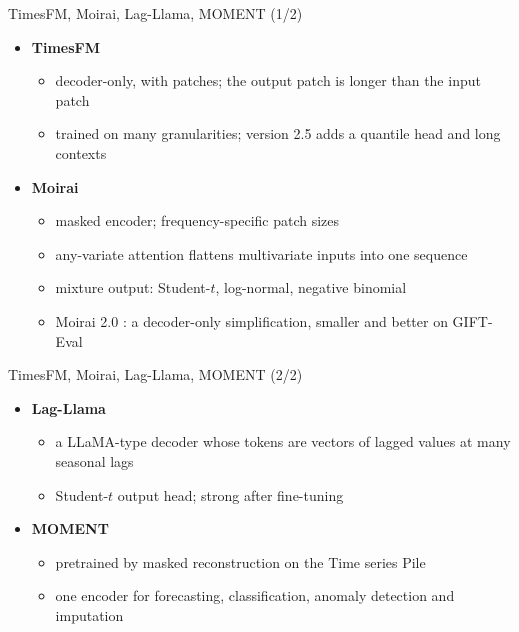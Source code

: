 \begin{frame}{TimesFM, Moirai, Lag-Llama, MOMENT (1/2)}
\itemsize{\small}
\begin{itemize}
    \item \textbf{TimesFM} 
    \begin{itemize}
        \item decoder-only, with patches; the output patch is longer than the input patch
        \item trained on many granularities; version 2.5 adds a quantile head and long contexts
    \end{itemize}
    \item \textbf{Moirai} 
    \begin{itemize}
        \item masked encoder; frequency-specific patch sizes
        \item any-variate attention flattens multivariate inputs into one sequence
        \item mixture output: Student-$t$, log-normal, negative binomial
        \item Moirai 2.0 : a decoder-only simplification, smaller and better on GIFT-Eval
    \end{itemize}
\end{itemize}
\end{frame}

\begin{frame}{TimesFM, Moirai, Lag-Llama, MOMENT (2/2)}
\itemsize{\small}
\begin{itemize}
    \item \textbf{Lag-Llama} 
    \begin{itemize}
        \item a LLaMA-type decoder whose tokens are vectors of lagged values at many seasonal lags
        \item Student-$t$ output head; strong after fine-tuning
    \end{itemize}
    \item \textbf{MOMENT} 
    \begin{itemize}
        \item pretrained by masked reconstruction on the Time series Pile
        \item one encoder for forecasting, classification, anomaly detection and imputation
    \end{itemize}
\end{itemize}
\end{frame}

